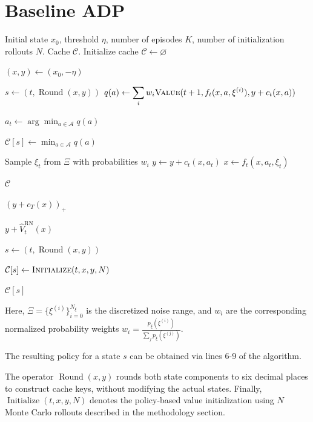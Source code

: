 \section{Baseline ADP}
\label{app:baseline-adp}

\begin{algorithm}[H]
	\caption{Baseline ADP}
	\label{alg:baseline-adp}
	\begin{algorithmic}[1]
		\Require Initial state $x_0$, threshold $\eta$,
		number of episodes $K$, number of initialization rollouts $N$.
		\Ensure Cache $\mathcal{C}$.
		\State Initialize cache $\mathcal{C} \gets \varnothing$
		
		\State $(x,y) \gets (x_0,-\eta)$
		
		\State $s \gets (t, \operatorname{Round}(x, y))$
		\State $\displaystyle q(a) \gets
		\sum_{i} w_i
		\Call{Value}{
			t+1,
			f_t(x,a,\xi^{(i)}),
			y+c_t(x,a)
		}$
		\EndFor
		
		\State $\displaystyle a_t \gets
		\arg\min_{a \in \mathcal{A}} q(a)$
		
		\State $\displaystyle \mathcal{C}[s]
		\gets \min_{a \in \mathcal{A}} q(a)$
		\EndIf
		
		\State Sample $\xi_t$ from $\Xi$ with probabilities $w_i$
		\State $y \gets y+c_t(x,a_t)$
		\State $x \gets f_t(x,a_t,\xi_t)$
		\EndFor
		\EndFor
		
		\State \Return $\mathcal{C}$
		
		\Statex
		
		\State \Return $(y+c_T(x))_+$
		\EndIf
		
		\State \Return $y+\hat V_t^{\text{RN}}(x)$
		\EndIf
		
		\State $s \gets (t,\operatorname{Round}(x,y))$
		
		\State $\mathcal{C}[s] \gets
		\Call{Initialize}{t,x,y,N}$
		\EndIf
		
		\State \Return $\mathcal{C}[s]$
		\EndFunction
	\end{algorithmic}
\end{algorithm}

Here, $\Xi = \{\xi^{(i)}\}_{i=0}^{N_{\xi}}$ is the discretized noise range, and $w_i$ are the corresponding normalized probability weights $w_i = \frac{p_{\xi}(\xi^{(i)})}{\sum_j p_{\xi}(\xi^{(j)})}$.

The resulting policy for a state $s$ can be obtained via lines 6-9 of the algorithm.

The operator $\operatorname{Round}(x,y)$ rounds both state
components to six decimal places to construct cache keys,
without modifying the actual states.
Finally, $\operatorname{Initialize}(t,x,y,N)$ denotes the
policy-based value initialization using $N$ Monte Carlo
rollouts described in the methodology section.